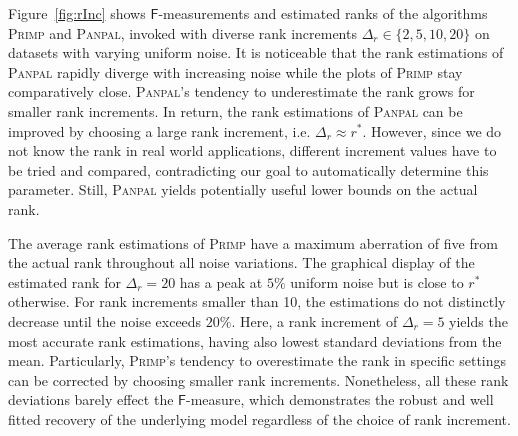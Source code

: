 Figure~\ref{fig:rInc} shows $\mathsf{F}$-measurements and estimated ranks of the algorithms \textsc{Primp} and \textsc{Panpal}, invoked with diverse rank increments $\Delta_r\in \{2,5,10,20\}$ on datasets with varying uniform noise. It is noticeable that the rank estimations of \textsc{Panpal} rapidly diverge  with increasing noise while the plots of \textsc{Primp} stay comparatively close. \textsc{Panpal}'s tendency to underestimate the rank grows for smaller rank increments. In return, the rank estimations of \textsc{Panpal} can be improved by choosing a large rank increment, i.e. $\Delta_r\approx r^*$. However, since we do not know the rank in real world applications, different increment values have to be tried and compared, contradicting our goal to automatically determine this parameter. Still, \textsc{Panpal} yields potentially useful lower bounds on the actual rank.

The average rank estimations of \textsc{Primp} have a maximum aberration of five from the actual rank throughout all noise variations. The graphical display of the estimated rank for $\Delta_r=20$ has a peak at $5\%$ uniform noise but is close to $r^*$ otherwise. For rank increments smaller than 10, the estimations do not distinctly decrease until the noise exceeds $20\%$. Here, a rank increment of $\Delta_r=5$ yields the most accurate rank estimations, having also lowest standard deviations from the mean. Particularly, \textsc{Primp}'s tendency to overestimate the rank in specific settings can be corrected by choosing smaller rank increments. Nonetheless, all these rank deviations barely effect the $\mathsf{F}$-measure, which demonstrates the robust and well fitted recovery of the underlying model regardless of the choice of rank increment. 

